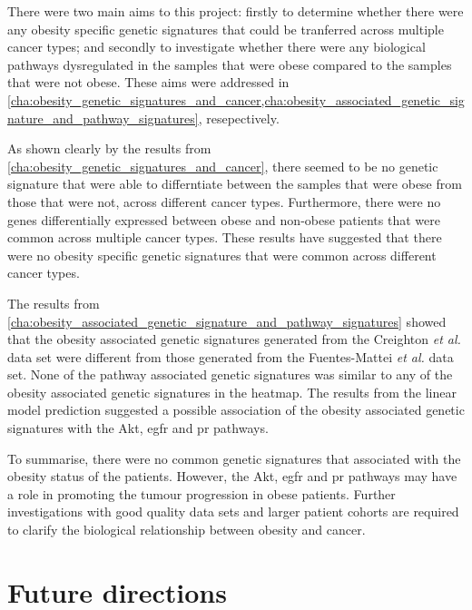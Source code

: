 There were two main aims to this project: firstly to determine whether there were any obesity specific genetic signatures that could be tranferred across multiple cancer types; and secondly to investigate whether there were any biological pathways dysregulated in the samples that were obese compared to the samples that were not obese.
These aims were addressed in \cref{cha:obesity_genetic_signatures_and_cancer,cha:obesity_associated_genetic_signature_and_pathway_signatures}, resepectively.

As shown clearly by the results from \cref{cha:obesity_genetic_signatures_and_cancer}, there seemed to be no  genetic signature that were able to differntiate between the samples that were obese from those that were not, across different cancer types.
Furthermore, there were no genes differentially expressed between obese and non-obese patients that were common across multiple cancer types.
These results have suggested that there were no obesity specific genetic signatures that were common across different cancer types.

The results from \cref{cha:obesity_associated_genetic_signature_and_pathway_signatures} showed that the obesity associated genetic signatures generated from the Creighton \textit{et al.} data set were different from those generated from the Fuentes-Mattei \textit{et al.} data set.
None of the pathway associated genetic signatures was similar to any of the obesity associated genetic signatures in the heatmap.
The results from the linear model prediction suggested a possible association of the obesity associated genetic signatures with the Akt, \gls{egfr} and \gls{pr} pathways.

To summarise, there were no common genetic signatures that associated with the obesity status of the patients.
However, the Akt, \gls{egfr} and \gls{pr} pathways may have a role in promoting the tumour progression in obese patients.
Further investigations with good quality data sets and larger patient cohorts are required to clarify the biological relationship between obesity and cancer.

\section{Future directions}
\label{sec:future_directions}













